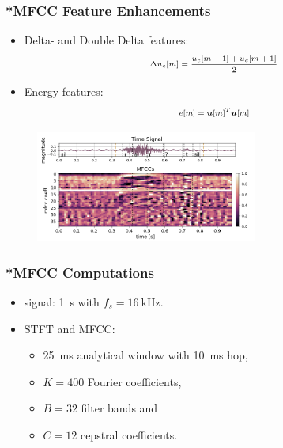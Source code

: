 \begin{frame}
  \frametitle{*MFCC Feature Enhancements}
  \begin{itemize}
    \item Delta- and Double Delta features:
    \vspace{0.2cm}
    \begin{equation*}
      \scriptsize
      \begin{aligned}
        \Delta u_c[m] = \frac{u_c[m - 1] + u_c[m + 1]}{2}
      \end{aligned}
    \end{equation*}
    \item Energy features:
    \begin{equation*}
      \scriptsize
      \begin{aligned}
        e[m] = \bm{u}[m]^T \bm{u}[m]
      \end{aligned}
    \end{equation*}
  \end{itemize}
  \begin{figure} \includegraphics[width=0.65\textwidth]{../3_signal/figs/signal_mfcc_showcase_mfcc39_right0.png} \end{figure}
\end{frame}

\begin{frame}
  \frametitle{*MFCC Computations}
  \begin{itemize}
    \item signal: \SI{1}{\second} with $f_s = \SI{16}{\kilo\hertz}$.
    \item STFT and MFCC:
    \vspace{-0.1cm}
    \begin{itemize}
      \item \SI{25}{\milli\second} analytical window with \SI{10}{\milli\second} hop,
      \item $K = 400$ Fourier coefficients,
      \item $B = 32$ filter bands and 
      \item $C=12$ cepstral coefficients.
    \end{itemize}
  \end{itemize}
  \vspace{-0.5cm}
  
\end{frame}

